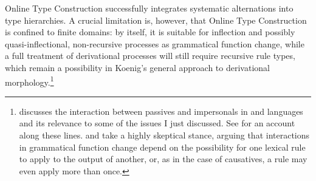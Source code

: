 \documentclass[output=paper
 	        ,biblatex
                ,babelshorthands
                ,newtxmath
                ,draftmode
                ,colorlinks, citecolor=brown
]{langscibook}
\begin{document}
Online Type Construction successfully integrates systematic
alternations into type hierarchies. A crucial limitation is, however,
that Online Type Construction is confined to finite domains: by itself, it is suitable for
inflection and possibly quasi-inflectional, non-recursive processes as
grammatical function change, while a full treatment of derivational
processes will still require recursive rule types, which remain a
possibility in Koenig's general approach to derivational
morphology.\footnote{\citet{Blevins2003a} discusses the interaction
  between passives and impersonals in  and  languages and
  its relevance to some of the issues I just discussed. See
  \citet{ASU99a-u} for an account along these lines.   and  take a
  highly skeptical stance, arguing that interactions in grammatical
  function change depend on the possibility for one lexical rule to
  apply to the output of another, or, as in the case of 
  causatives, a rule may even apply more than
  once.}
\end{document}
